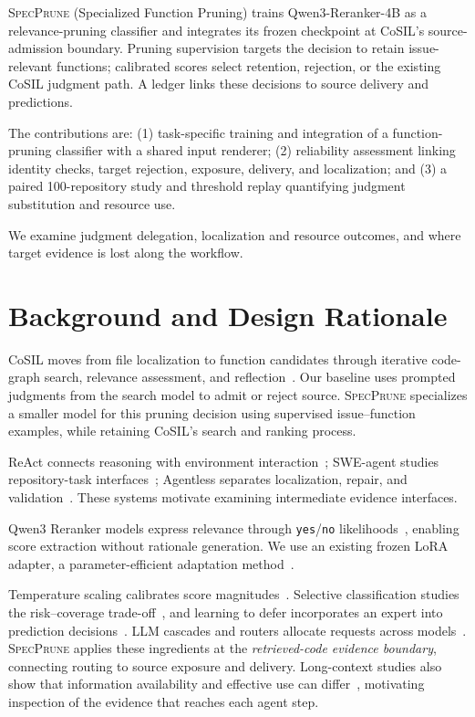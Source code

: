 \documentclass{svproc}
\newcommand{\specprune}{\textsc{SpecPrune}}
\begin{document}
\specprune{} (Specialized Function Pruning) trains Qwen3-Reranker-4B as a relevance-pruning classifier and integrates its frozen checkpoint at CoSIL's source-admission boundary. Pruning supervision targets the decision to retain issue-relevant functions; calibrated scores select retention, rejection, or the existing CoSIL judgment path. A ledger links these decisions to source delivery and predictions.

The contributions are: (1) task-specific training and integration of a function-pruning classifier with a shared input renderer; (2) reliability assessment linking identity checks, target rejection, exposure, delivery, and localization; and (3) a paired 100-repository study and threshold replay quantifying judgment substitution and resource use.

We examine judgment delegation, localization and resource outcomes, and where target evidence is lost along the workflow.

\section{Background and Design Rationale}
CoSIL moves from file localization to function candidates through iterative code-graph search, relevance assessment, and reflection~\cite{cosil2025}. Our baseline uses prompted judgments from the search model to admit or reject source. \specprune{} specializes a smaller model for this pruning decision using supervised issue--function examples, while retaining CoSIL's search and ranking process.

ReAct connects reasoning with environment interaction~\cite{react2023}; SWE-agent studies repository-task interfaces~\cite{sweagent2024}; Agentless separates localization, repair, and validation~\cite{agentless2024}. These systems motivate examining intermediate evidence interfaces.

Qwen3 Reranker models express relevance through \texttt{yes}/\texttt{no} likelihoods~\cite{qwen3embedding2025}, enabling score extraction without rationale generation. We use an existing frozen LoRA adapter, a parameter-efficient adaptation method~\cite{hu2021lora}.

Temperature scaling calibrates score magnitudes~\cite{guo2017calibration}. Selective classification studies the risk--coverage trade-off~\cite{geifman2017selective,geifman2019selectivenet}, and learning to defer incorporates an expert into prediction decisions~\cite{mozannar2020defer}. LLM cascades and routers allocate requests across models~\cite{frugalgpt2023,routellm2024}. \specprune{} applies these ingredients at the \emph{retrieved-code evidence boundary}, connecting routing to source exposure and delivery. Long-context studies also show that information availability and effective use can differ~\cite{liu2024lostmiddle}, motivating inspection of the evidence that reaches each agent step.
\end{document}
